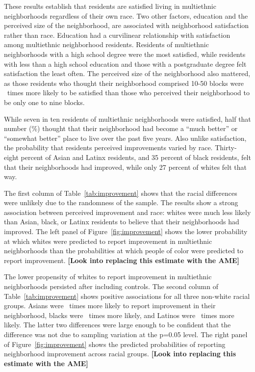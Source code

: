 \documentclass{baderart}
\begin{document}
These results establish that residents are satisfied living in multiethnic neighborhoods regardless of their own race. Two other factors, education and the perceived size of the neighborhood, are associated with neighborhood satisfaction rather than race. Education had a curvilinear relationship with satisfaction among multiethnic neighborhood residents. Residents of multiethnic neighborhoods with a high school degree were the most satisfied, while residents with less than a high school education and those with a postgraduate degree felt satisfaction the least often. The perceived size of the neighborhood also mattered, as those residents who thought their neighborhood comprised 10-50 blocks were \satnhdsize\ times more likely to be satisfied than those who perceived their neighborhood to be only one to nine blocks. 

While seven in ten residents of multiethnic neighborhoods were satisfied, half that number (\meanimproved \%) thought that their neighborhood had become a ``much better'' or ``somewhat better'' place to live over the past five years. Also unlike satisfaction, the probability that residents perceived improvements varied by race. Thirty-eight percent of Asian and Latinx residents, and 35 percent of black residents, felt that their neighborhoods had improved, while only 27 percent of whites felt that way.

The first column of Table~\ref{tab:improvement} shows that the racial differences were unlikely due to the randomness of the sample. The results show a strong association between perceived improvement and race: whites were much less likely than Asian, black, or Latinx residents to believe that their neighborhoods had improved. The left panel of Figure~\ref{fig:improvement} shows the lower probability at which whites were predicted to report improvement in multiethnic neighborhoods than the probabilities at which people of color were predicted to report improvement. \textbf{{[}Look into replacing this estimate with the AME{]}}


The lower propensity of whites to report improvement in multiethnic neighborhoods persisted after including controls. The second column of Table~\ref{tab:improvement} shows positive associations for all three non-white racial groups. Asians were \apibetter~times more likely to report improvement in their neighborhood, blacks were \nhbbetter~times more likely, and Latinos were \hspbetter~times more likely. The latter two differences were large enough to be confident that the difference was not due to sampling variation at the p=0.05 level. The right panel of Figure~\ref{fig:improvement} shows the predicted probabilities of reporting neighborhood improvement across racial groups. \textbf{{[}Look into replacing this estimate with the AME{]}}
\end{document}
